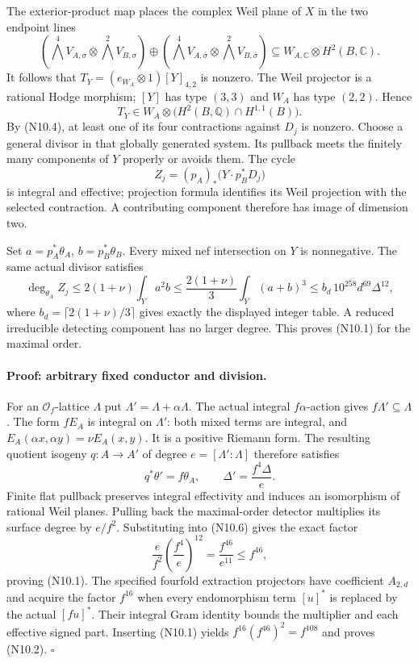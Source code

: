 The exterior-product map places the complex Weil plane of $X$ in
the two endpoint lines
\[
 (\bigwedge^4 V_{A,\sigma}\otimes\bigwedge^2V_{B,\sigma})
 \oplus
 (\bigwedge^4 V_{A,\bar\sigma}\otimes
                     \bigwedge^2V_{B,\bar\sigma})
 \subseteq W_{A,\mathbb C}\otimes H^2(B,\mathbb C).
\]
It follows that $T_Y=(e_{W_A}\otimes1)[Y]_{4,2}$ is nonzero.
The Weil projector is a rational Hodge morphism; $[Y]$ has type
$(3,3)$ and $W_A$ has type $(2,2)$. Hence
\[
 T_Y\in W_A\otimes\bigl(H^2(B,\mathbb Q)\cap H^{1,1}(B)\bigr).
\]
By (N10.4), at least one of its four contractions against $D_j$
is nonzero. Choose a general divisor in that globally generated
system. Its pullback meets the finitely many components of $Y$
properly or avoids them. The cycle
\[
 Z_j=(p_A)_*\bigl(Y\cdot p_B^*D_j\bigr)
\]
is integral and effective; projection formula identifies its Weil
projection with the selected contraction. A contributing component
therefore has image of dimension two.

Set $a=p_A^*\theta_A$, $b=p_B^*\theta_B$. Every mixed nef
intersection on $Y$ is nonnegative. The same actual divisor satisfies
\[
 \deg_{\theta_A}Z_j
 \le 2(1+\nu)\int_Ya^2b
 \le \frac{2(1+\nu)}3\int_Y(a+b)^3
 \le b_d\,10^{258}d^{69}\Delta^{12},                       \tag{N10.6}
\]
where $b_d=\lceil2(1+\nu)/3\rceil$ gives exactly the displayed
integer table. A reduced irreducible detecting component has no
larger degree. This proves (N10.1) for the maximal order.

\paragraph{Proof: arbitrary fixed conductor and division.}
For an $\mathcal O_f$-lattice $\Lambda$ put
$\Lambda'=\Lambda+\alpha\Lambda$. The actual integral
$f\alpha$-action gives $f\Lambda'\subseteq\Lambda$.
The form $fE_A$ is integral on $\Lambda'$: both mixed terms are
integral, and
$E_A(\alpha x,\alpha y)=\nu E_A(x,y)$.
It is a positive Riemann form. The resulting quotient isogeny
$q:A\to A'$ of degree $e=[\Lambda':\Lambda]$ therefore satisfies
\[
 q^*\theta'=f\theta_A,\qquad
 \Delta'=\frac{f^4\Delta}{e}.
\]
Finite flat pullback preserves integral effectivity and induces an
isomorphism of rational Weil planes. Pulling back the maximal-order
detector multiplies its surface degree by $e/f^2$. Substituting into
(N10.6) gives the exact factor
\[
 \frac e{f^2}\left(\frac{f^4}{e}\right)^{12}
 =\frac{f^{46}}{e^{11}}\le f^{46},
\]
proving (N10.1). The specified fourfold extraction projectors have
coefficient $A_{2,d}$ and acquire the factor $f^{16}$ when every
endomorphism term $[u]^*$ is replaced by the actual $[fu]^*$.
Their integral Gram identity bounds the multiplier and each effective
signed part. Inserting (N10.1) yields
$f^{16}(f^{46})^2=f^{108}$ and proves (N10.2).
\hfill$\square$

